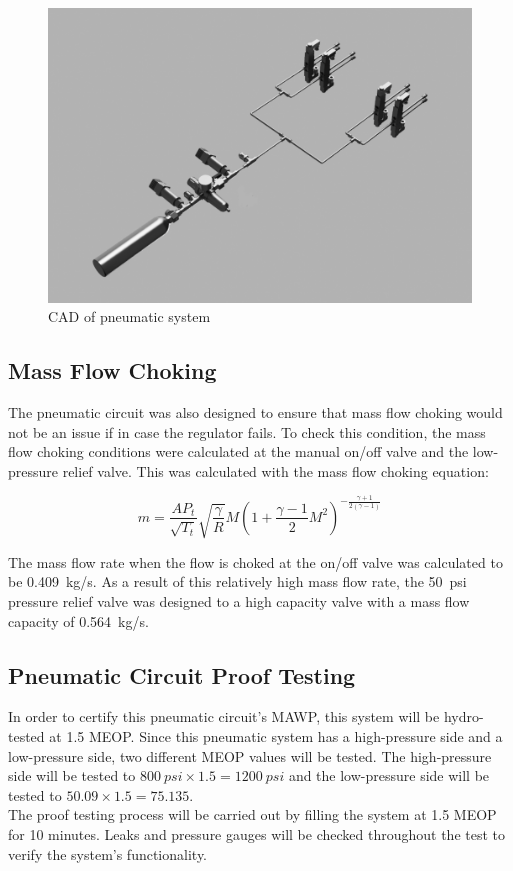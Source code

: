 \documentclass[main.tex]{subfiles}
\begin{document}
	\begin{figure}
        \centering
        \includegraphics[width=\linewidth] {images/pcircuit}
        \caption{CAD of pneumatic system}
        \label{fig:pneumatic-cad}
    \end{figure}
    
  \subsection{Mass Flow Choking}
The pneumatic circuit was also designed to ensure that mass flow choking would not be an issue if in case the regulator fails. To check this condition, the mass flow choking conditions were calculated at the manual on/off valve and the low-pressure relief valve. This was calculated with the mass flow choking equation:\\
\begin{center}
        \[
        {m} = \frac{AP_t}{\sqrt{T_t}} \sqrt{\frac{\gamma}{R}}M(1+\frac{\gamma-1}{2}{M^2})^{-\frac{\gamma+1}{2(\gamma-1)}}
        \]
	\end{center}
    
The mass flow rate when the flow is choked at the on/off valve was calculated to be \SI{0.409}{kg/s}. 
As a result of this relatively high mass flow rate, the \SI{50}{psi} pressure relief valve was designed to a high capacity valve with a mass flow capacity of \SI{0.564}{kg/s}.\\

    \subsection{Pneumatic Circuit Proof Testing}    
    In order to certify this pneumatic circuit's MAWP, this system will be hydro-tested at 1.5 MEOP. Since this pneumatic system has a high-pressure side and a low-pressure side, two different MEOP values will be tested. The high-pressure side will be tested to $\SI{800}{psi}\times 1.5=\SI{1200}{psi}$ and the low-pressure side will be tested to $50.09 \times 1.5=75.135$.\\
    The proof testing process will be carried out by filling the system at 1.5 MEOP for 10 minutes. Leaks and pressure gauges will be checked throughout the test to verify the system's functionality.\\
    
\end{document}
